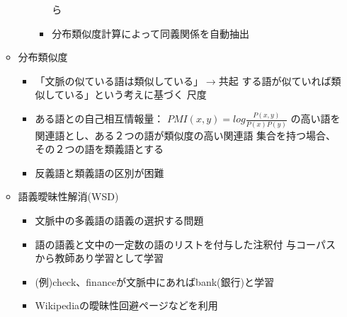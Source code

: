 \documentclass[a4j,11pt]{jsarticle}
\begin{document}
\begin{itemize}
\begin{itemize}
\begin{itemize}
\begin{itemize}
			    ら
		      \item 分布類似度計算によって同義関係を自動抽出
		     \end{itemize}
	      \end{itemize}
	\item 分布類似度
	      \begin{itemize}
	       \item 「文脈の似ている語は類似している」$\rightarrow$共起
		     する語が似ていれば類似している」という考えに基づく
		     尺度
	       \item ある語との自己相互情報量：
		     $PMI(x,y) = log{\frac{P(x,y)}{P(x)P(y)}}$
		     の高い語を関連語とし、ある２つの語が類似度の高い関連語
		     集合を持つ場合、その２つの語を類義語とする
	       \item 反義語と類義語の区別が困難
	      \end{itemize}
	\item 語義曖昧性解消(WSD)
	      \begin{itemize}
	       \item 文脈中の多義語の語義の選択する問題
	       \item 語の語義と文中の一定数の語のリストを付与した注釈付
		     与コーパスから教師あり学習として学習
	       \item (例)check、financeが文脈中にあればbank(銀行)と学習
	       \item Wikipediaの曖昧性回避ページなどを利用
	      \end{itemize}
       \end{itemize}
\end{itemize}
\end{document}
